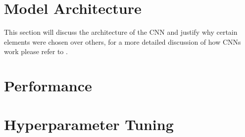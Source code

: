 \section{Model Architecture}
This section will discuss the architecture of the CNN and justify why certain elements were chosen over others, for a more detailed discussion of how CNNs work please refer to \cite{Richmond19b}.
\section{Performance}

\section{Hyperparameter Tuning}

